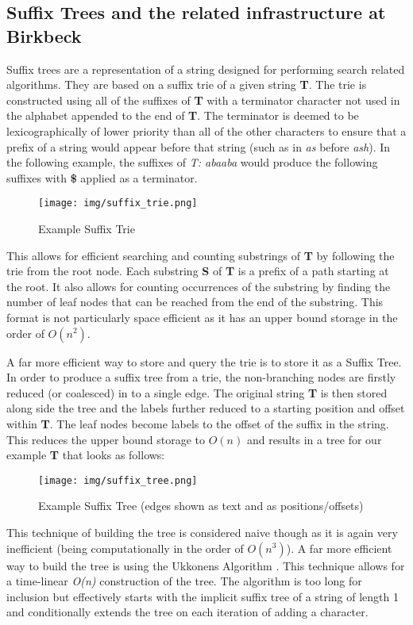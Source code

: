 \documentclass[11pt]{scrartcl}
\begin{document}
\subsection{Suffix Trees and the related infrastructure at Birkbeck}
	Suffix trees \citep{suffix} are a representation of a string designed for performing search related algorithms.  They are based on a suffix trie of a given string \textbf{T}.  The trie is constructed using all of the suffixes of \textbf{T} with a terminator character not used in the alphabet appended to the end of \textbf{T}.  The terminator is deemed to be lexicographically of lower priority than all of the other characters to ensure that a prefix of a string would appear before that string (such as in \textit{as} before \textit{ash}). In the following example, the suffixes of \textit{T: abaaba} would produce the following suffixes with \textbf{\$} applied as a terminator.
	\begin{figure}[h]
		\centering
		\texttt{[image: img/suffix\_trie.png]}
		\caption{Example Suffix Trie}
	\end{figure}
	
	This allows for efficient searching and counting substrings of \textbf{T} by following the trie from the root node.  Each substring \textbf{S} of \textbf{T} is a prefix of a path starting at the root.  It also allows for counting occurrences of the substring by finding the number of leaf nodes that can be reached from the end of the substring.  This format is not particularly space efficient as it has an upper bound storage in the order of \textit{$O(n^{2})$}.
	
	A far more efficient way to store and query the trie is to store it as a Suffix Tree.  In order to produce a suffix tree from a trie, the non-branching nodes are firstly reduced (or coalesced) in to a single edge.  The original string \textbf{T} is then stored along side the tree and the labels further reduced to a starting position and offset within \textbf{T}.  The leaf nodes become labels to the offset of the suffix in the string.  This reduces the upper bound storage to \textit{$O(n)$} and results in a tree for our example \textbf{T} that looks as follows:
	\begin{figure}[h]
		\centering
		\texttt{[image: img/suffix\_tree.png]}
		\caption{Example Suffix Tree (edges shown as text and as positions/offsets)}
	\end{figure}
	
	This technique of building the tree is considered naive though as it is again very inefficient (being computationally in the order of \textit{$O(n^{3})$}).  A far more efficient way to build the tree is using the Ukkonens Algorithm \citep{ukkonens}.  This technique allows for a time-linear \textit{O(n)} construction of the tree.  The algorithm is too long for inclusion but effectively starts with the implicit suffix tree of a string of length 1 and conditionally extends the tree on each iteration of adding a character.
	
\end{document}
